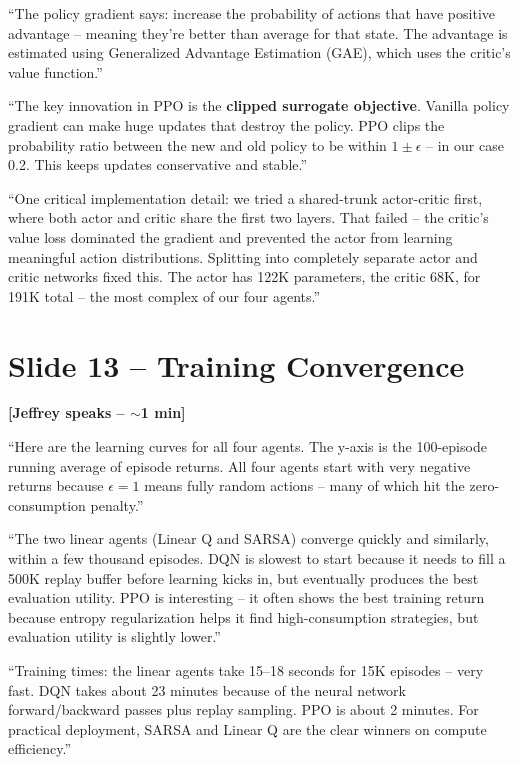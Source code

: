 \documentclass[11pt, letterpaper]{article}
\begin{document}
``The policy gradient says: increase the probability of actions that have positive advantage -- meaning they're better than average for that state. The advantage is estimated using Generalized Advantage Estimation (GAE), which uses the critic's value function.''

``The key innovation in PPO is the \textbf{clipped surrogate objective}. Vanilla policy gradient can make huge updates that destroy the policy. PPO clips the probability ratio between the new and old policy to be within $1 \pm \epsilon$ -- in our case 0.2. This keeps updates conservative and stable.''

``One critical implementation detail: we tried a shared-trunk actor-critic first, where both actor and critic share the first two layers. That failed -- the critic's value loss dominated the gradient and prevented the actor from learning meaningful action distributions. Splitting into completely separate actor and critic networks fixed this. The actor has 122K parameters, the critic 68K, for 191K total -- the most complex of our four agents.''

\section{Slide 13 -- Training Convergence}

\textbf{[Jeffrey speaks -- $\sim$1 min]}

``Here are the learning curves for all four agents. The y-axis is the 100-episode running average of episode returns. All four agents start with very negative returns because $\epsilon = 1$ means fully random actions -- many of which hit the zero-consumption penalty.''

``The two linear agents (Linear Q and SARSA) converge quickly and similarly, within a few thousand episodes. DQN is slowest to start because it needs to fill a 500K replay buffer before learning kicks in, but eventually produces the best evaluation utility. PPO is interesting -- it often shows the best training return because entropy regularization helps it find high-consumption strategies, but evaluation utility is slightly lower.''

``Training times: the linear agents take 15--18 seconds for 15K episodes -- very fast. DQN takes about 23 minutes because of the neural network forward/backward passes plus replay sampling. PPO is about 2 minutes. For practical deployment, SARSA and Linear Q are the clear winners on compute efficiency.''
\end{document}
